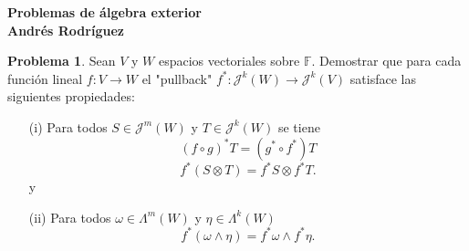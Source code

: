 \documentclass{article}
\theoremstyle{plain}
\theoremstyle{definition}
\newtheorem{ex}{Problema}
\theoremstyle{remark}
\newcommand{\Fi}{\mathbb{F}}
\begin{document}
$ $\\
\textbf{\Large Problemas de \'algebra exterior}\\
\textbf{\large Andr\'es Rodr\'iguez}

  \begin{ex}
    Sean $V$ y $W$ espacios vectoriales sobre $\Fi$. Demostrar que para cada funci\'on lineal $f:V\to W$ el "pullback" $f^*: \mathscr{J}^k(W) \to \mathcal{J}^k(V)$ satisface las siguientes propiedades:
    \begin{itemize}
      \item[(i)] Para todos $S\in \mathcal{J}^m(W) $ y $T\in\mathcal{J}^k(W)$ se tiene
      $$(f\circ g)^*T = (g^*\circ f^*)T$$
      $$f^*(S\otimes T) = f^* S \otimes f^* T.$$
      y
      \item[(ii)] Para todos $\omega \in \Lambda ^m (W)$ y $\eta\in\Lambda^k(W)$
      $$f^*(\omega\wedge\eta)= f^*\omega\wedge f^*\eta.$$
    \end{itemize}
  \end{ex}
\end{document}
